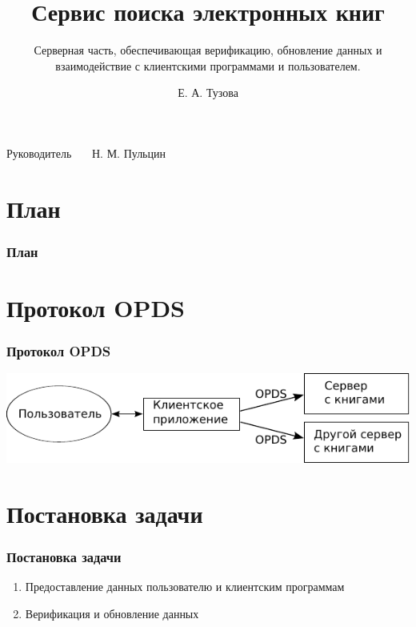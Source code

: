\documentclass[handout]{beamer}
\title{Сервис поиска электронных книг }
\subtitle{Серверная часть, обеспечивающая верификацию, обновление данных и взаимодействие с клиентскими программами и пользователем.}
\author{Е. А. Тузова}
\institute{Академический Университет РАН}
\date{}
\begin{document}
\begin{frame}
  \titlepage

  \begin{flushright}
  
    Руководитель~~~  Н. М. Пульцин

  \end{flushright}
\end{frame}

\section*{План}
  \begin{frame}
    \frametitle{План}
    \tableofcontents[pausesections]

  \end{frame}

\section{Протокол OPDS}
  \begin{frame}

    \frametitle{Протокол OPDS}
    
	\includegraphics{./head/scheme}
  \end{frame}

\section{Постановка задачи}
  \begin{frame}

    \frametitle{Постановка задачи}
    \begin{enumerate}
      \item Предоставление данных пользователю и клиентским программам
      \item Верификация и обновление данных
    \end{enumerate}
  \end{frame}
\end{document}
